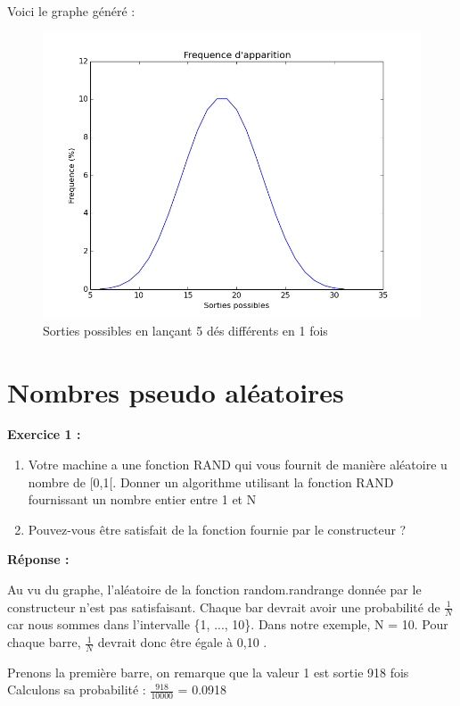 \documentclass{book}
\begin{document}
Voici le graphe généré : 
\begin{figure}[h!]
	\centering
	\includegraphics[width=\textwidth]{lancer_de_5_des.png}
	\caption{Sorties possibles en lançant 5 dés différents en 1 fois}
\end{figure}
\section{Nombres pseudo aléatoires}
\textbf{Exercice 1 :}
\begin{enumerate}
	\item Votre machine a une fonction RAND qui vous fournit de manière aléatoire u nombre de [0,1[. Donner un algorithme utilisant la fonction RAND fournissant un nombre entier entre 1 et N
	\item Pouvez-vous être satisfait de la fonction fournie par le constructeur ?
\end{enumerate}

\textbf{Réponse :} \newline 

Au vu du graphe, l'aléatoire de la fonction random.randrange donnée par le constructeur n'est pas satisfaisant. Chaque bar devrait avoir une probabilité de $\frac{1}{N}$ car nous sommes dans l'intervalle \{1, ..., 10\}. Dans notre exemple, N = 10. Pour chaque barre, $\frac{1}{N}$ devrait donc être égale à 0,10 .

Prenons la première barre, on remarque que la valeur 1 est sortie 918 fois Calculons sa probabilité : $\frac{918}{10000}$ = 0.0918
\end{document}

